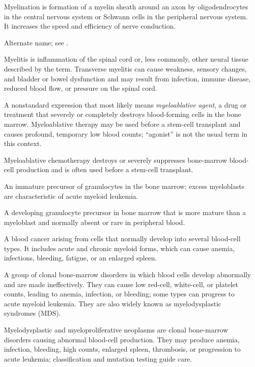  Myelination is formation of a myelin sheath around an axon by oligodendrocytes in the central nervous system or Schwann cells in the peripheral nervous system. It increases the speed and efficiency of nerve conduction.

 Alternate name; see .

 Myelitis is inflammation of the spinal cord or, less commonly, other neural tissue described by the term. Transverse myelitis can cause weakness, sensory changes, and bladder or bowel dysfunction and may result from infection, immune disease, reduced blood flow, or pressure on the spinal cord.

 A nonstandard expression that most likely means \textit{myeloablative agent}, a drug or treatment that severely or completely destroys blood-forming cells in the bone marrow. Myeloablative therapy may be used before a stem-cell transplant and causes profound, temporary low blood counts; ``agonist'' is not the usual term in this context.

 Myeloablative chemotherapy destroys or severely suppresses bone-marrow blood-cell production and is often used before a stem-cell transplant.

 An immature precursor of granulocytes in the bone marrow; excess myeloblasts are characteristic of acute myeloid leukemia.

 A developing granulocyte precursor in bone marrow that is more mature than a myeloblast and normally absent or rare in peripheral blood.

 A blood cancer arising from cells that normally develop into several blood-cell types. It includes acute and chronic myeloid forms, which can cause anemia, infections, bleeding, fatigue, or an enlarged spleen.

 A group of clonal bone-marrow disorders in which blood cells develop abnormally and are made ineffectively. They can cause low red-cell, white-cell, or platelet counts, leading to anemia, infection, or bleeding; some types can progress to acute myeloid leukemia. They are also widely known as myelodysplastic syndromes (MDS).

 Myelodysplastic and myeloproliferative neoplasms are clonal bone-marrow disorders causing abnormal blood-cell production. They may produce anemia, infection, bleeding, high counts, enlarged spleen, thrombosis, or progression to acute leukemia; classification and mutation testing guide care.

